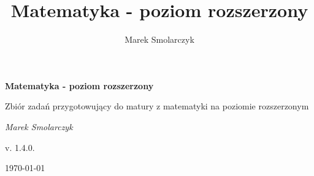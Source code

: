 \documentclass[a4paper,12pt]{book}
\begin{document}
\frontmatter

\begin{titlepage}
	\centering
	{ \bfseries \LARGE Matematyka - poziom rozszerzony \par }
	\vspace{1cm}
	{ \large Zbiór zadań przygotowujący do matury z matematyki na poziomie rozszerzonym \par }
	\vspace{3cm}
	{ \itshape \large Marek Smolarczyk \par }
	\vfill
	{ \large v. 1.4.0. \par }
	\vspace{0.2cm}
	{ \large \today \par }
\end{titlepage}

\author{Marek Smolarczyk}
\title{Matematyka - poziom rozszerzony}

\tableofcontents

\mainmatter


\backmatter
\end{document}

